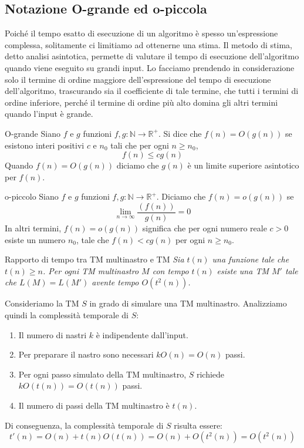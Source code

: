 \subsection{Notazione O-grande ed o-piccola}
Poiché il tempo esatto di esecuzione di un algoritmo è spesso un'espressione complessa, solitamente ci limitiamo ad ottenerne una stima. Il metodo di stima, detto analisi asintotica, permette di valutare il tempo di esecuzione dell'algoritmo quando viene eseguito su grandi input. Lo facciamo prendendo in considerazione solo il termine di ordine maggiore dell'espressione del tempo di esecuzione dell'algoritmo, trascurando sia il coefficiente di tale termine, che tutti i termini di ordine inferiore, perché il termine di ordine più alto domina gli altri termini quando l'input è grande.

\begin{Definition}{O-grande}{}
Siano $f$ e $g$ funzioni $f,g: \mathbb{N}\longrightarrow\mathbb{R}^+$. Si dice che $f(n) = O(g(n))$ se esistono interi positivi $c$ e $n_0$ tali che per ogni $n \geq n_{0}$,
\begin{equation*}
    f(n) \leq cg(n)    
\end{equation*}
Quando $f(n) = O(g(n))$ diciamo che $g(n)$ è un limite superiore asintotico per $f(n)$.
\end{Definition}

\begin{Definition}{o-piccolo}{}
Siano $f$ e $g$ funzioni $f ,g: \mathbb{N}\longrightarrow\mathbb{R}^+$. Diciamo che $f(n) = o(g(n))$ se 
\begin{equation*}
\lim_{n\to\infty}\frac{(f(n))}{g(n)}=0
\end{equation*}
In altri termini, $f(n) = o(g(n))$ significa che per ogni numero reale $c > 0$ esiste un numero $n_0$, tale che $f(n) < cg(n)$ per ogni $n \geq n_{0}$.
\end{Definition}

\begin{Example}{Rapporto di tempo tra TM multinastro e TM}{}
\textit{Sia $t(n)$ una funzione tale che $t(n) \geq n$. Per ogni TM multinastro $M$ con tempo $t(n)$ esiste una TM $M'$ tale che $L(M) = L(M')$ avente tempo $O(t^2(n))$.}

Consideriamo la TM $S$ in grado di simulare una TM multinastro. Analizziamo quindi la complessità temporale di $S$:
\begin{enumerate}
    \item Il numero di nastri $k$ è indipendente dall’input.
    \item Per preparare il nastro sono necessari $kO(n) = O(n)$ passi.
    \item Per ogni passo simulato della TM multinastro, $S$ richiede $kO(t(n)) = O(t(n))$ passi.
    \item Il numero di passi della TM multinastro è $t(n)$.
\end{enumerate}
Di conseguenza, la complessità temporale di $S$ risulta essere: 
\begin{equation*}
    t'(n) = O(n) + t(n)O(t(n)) = O(n) + O(t^2(n)) = O(t^2(n))
\end{equation*}
\end{Example}

